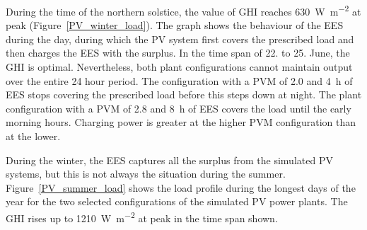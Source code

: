 
During the time of the northern solstice, the value of GHI reaches \SI{630}{\watt\per\square\metre} at peak (Figure~\ref{PV_winter_load}). The graph shows the behaviour of the EES during the day, during which the PV system first covers the prescribed load and then charges the EES with the surplus. In the time span of 22. to 25. June, the GHI is optimal. Nevertheless, both plant configurations cannot maintain output over the entire 24 hour period. The configuration with a PVM of \num{2.0} and \SI{4}{h} of EES stops covering the prescribed load before this steps down at night. The plant configuration with a PVM of \num{2.8} and \SI{8}{h} of EES covers the load until the early morning hours. Charging power is greater at the higher PVM configuration than at the lower.


During the winter, the EES captures all the surplus from the simulated PV systems, but this is not always the situation during the summer. Figure~\ref{PV_summer_load} shows the load profile during the longest days of the year for the two selected configurations of the simulated PV power plants. The GHI rises up to \SI{1210}{\watt\per\square\metre} at peak in the time span shown.



